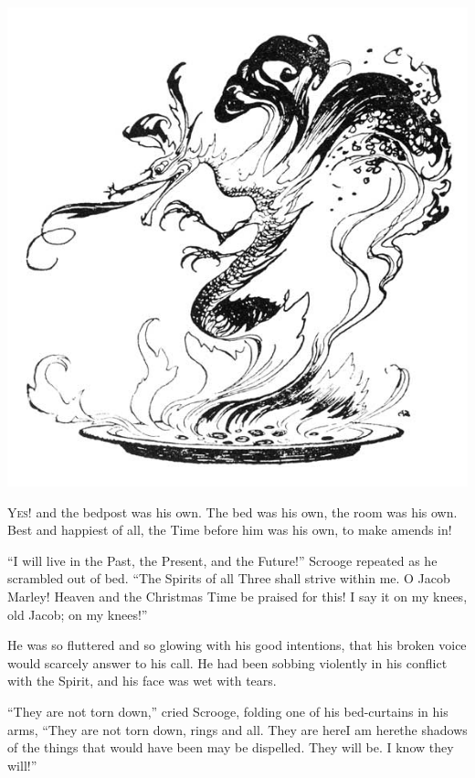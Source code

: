 \documentclass[paper=5.5in:8.5in,BCOR=5mm,twoside,DIV=calc,12pt,usegeometry]{scrbook} %
\begin{document}
\begin{minipage}[c]{\linewidth}
\includegraphics[width=\linewidth]{gs168}
\end{minipage}

\lettrine[loversize=.85]{Y}{es!} and the bedpost was his own. The bed was his own, the room was his own. Best and happiest of all, the Time before him was his own, to make amends in!

\enquote{I will live in the Past, the Present, and the Future!} Scrooge repeated as he scrambled out of bed. \enquote{The Spirits of all Three shall strive within me. O Jacob Marley! Heaven and the Christmas Time be praised for this! I say it on my knees, old Jacob; on my knees!}

He was so fluttered and so glowing with his good intentions, that his broken voice would scarcely answer to his call. He had been sobbing violently in his conflict with the Spirit, and his face was wet with tears.

\enquote{They are not torn down,} cried Scrooge, folding one of his bed-curtains in his arms, \enquote{They are not torn down, rings and all. They are here\textemdash I am here\textemdash the shadows of the things that would have been may be dispelled. They will be. I know they will!}
\end{document}
